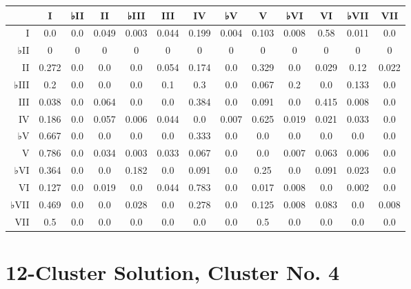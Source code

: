 \begin{table}[htbp]
\begin{minipage}{\linewidth}
\setlength{\tymax}{0.5\linewidth}
\centering
\small
\begin{tabulary}{\textwidth}{@{}RCCCCCCCCCCCC@{}} \toprule
&I&♭II&II&♭III&III&IV&♭V&V&♭VI&VI&♭VII&VII\\
\midrule
I&0.0&0.0&0.049&0.003&0.044&0.199&0.004&0.103&0.008&0.58&0.011&0.0\\
♭II&0&0&0&0&0&0&0&0&0&0&0&0\\
II&0.272&0.0&0.0&0.0&0.054&0.174&0.0&0.329&0.0&0.029&0.12&0.022\\
♭III&0.2&0.0&0.0&0.0&0.1&0.3&0.0&0.067&0.2&0.0&0.133&0.0\\
III&0.038&0.0&0.064&0.0&0.0&0.384&0.0&0.091&0.0&0.415&0.008&0.0\\
IV&0.186&0.0&0.057&0.006&0.044&0.0&0.007&0.625&0.019&0.021&0.033&0.0\\
♭V&0.667&0.0&0.0&0.0&0.0&0.333&0.0&0.0&0.0&0.0&0.0&0.0\\
V&0.786&0.0&0.034&0.003&0.033&0.067&0.0&0.0&0.007&0.063&0.006&0.0\\
♭VI&0.364&0.0&0.0&0.182&0.0&0.091&0.0&0.25&0.0&0.091&0.023&0.0\\
VI&0.127&0.0&0.019&0.0&0.044&0.783&0.0&0.017&0.008&0.0&0.002&0.0\\
♭VII&0.469&0.0&0.0&0.028&0.0&0.278&0.0&0.125&0.008&0.083&0.0&0.008\\
VII&0.5&0.0&0.0&0.0&0.0&0.0&0.0&0.5&0.0&0.0&0.0&0.0\\

\bottomrule

\end{tabulary}
\end{minipage}
\end{table}

\section{12-Cluster Solution, Cluster No. 4}
\label{12-clustersolutionclusterno.4}

